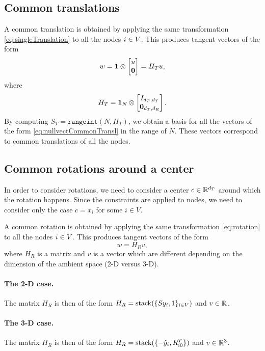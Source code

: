 \documentclass[12pt]{article}
\newcommand{\kron}{\otimes}
\newcommand{\rangeint}{\texttt{rangeint}}
\begin{document}
\subsection{Common translations}
\label{sec:common-translations}
A common translation is obtained by applying the same transformation \eqref{eq:singleTranslation} to all the nodes ${i \in V}$. This produces tangent vectors of the form
\begin{equation}
  \label{eq:nullvectCommonTransl}
  w=\vct{1}\kron\bmat{u\\\vct{0}}=H_Tu,  
\end{equation}
where
\begin{equation}
  H_T=\vct{1}_N\kron\bmat{I_{d_T,d_T}\\\vct{0}_{d_T,d_R}}.
\end{equation}
By computing $S_T=\rangeint(N,H_T)$, we obtain a basis for all the vectors of the form \eqref{eq:nullvectCommonTransl} in the range of $N$. These vectors correspond to common translations of all the nodes.

\subsection{Common rotations around a center}
In order to consider rotations, we need to consider a center $c\in\mathbb{R}^{d_T}{}$ around which the rotation happens. Since the constraints are applied to nodes, we need to consider only the case $c=x_i$ for some $i \in V$.


A common rotation is obtained by applying the same transformation \eqref{eq:rotation} to all the nodes ${i \in V}$. This produces tangent vectors of the form
\begin{equation}
  w=H_R v,
\end{equation}
where $H_R$ is a matrix and $v$ is a vector which are different depending on the dimension of the ambient space (2-D versus 3-D).
\paragraph{The 2-D case.} The matrix $H_R$ is then of the form $H_R=\operatorname{stack}(\{Sy_i,1\}_{i \in V})$ and $v\in\mathbb{R}^{}{}$.
\paragraph{The 3-D case.} The matrix $H_R$ is then of the form $H_R=\operatorname{stack}(\{-\hat{y}_i,R_{i0}^T\})$ and $v\in\mathbb{R}^{3}{}$.
\end{document}
